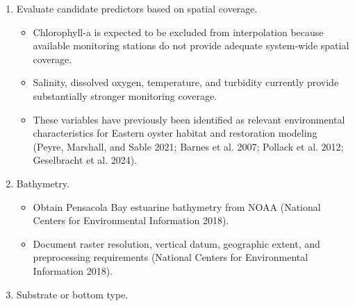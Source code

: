 \documentclass[
  letterpaper,
  DIV=11,
  numbers=noendperiod]{scrartcl}
\providecommand{\tightlist}{%
  \setlength{\itemsep}{0pt}\setlength{\parskip}{0pt}}
\begin{document}
\begin{enumerate}
\begin{enumerate}
    \begin{itemize}
    \tightlist
    \item
      Dissolved oxygen: approximately 145 stations and 3,072
      observations (USGS 2026).
    \item
      Salinity: approximately 135 stations and 3,401 observations (USGS
      2026).
    \item
      Temperature: approximately 145 stations and 3,442 observations
      (USGS 2026).
    \item
      Turbidity: approximately 122 stations and 1,563 observations (USGS
      2026).
    \item
      Chlorophyll-a: approximately 48 stations and 754 observations
      (USGS 2026).
    \item
      Current temporal coverage is approximately 2005--2024 (USGS 2026).
    \end{itemize}
  \item
    Evaluate candidate predictors based on spatial coverage.

    \begin{itemize}
    \tightlist
    \item
      Chlorophyll-a is expected to be excluded from interpolation
      because available monitoring stations do not provide adequate
      system-wide spatial coverage.
    \item
      Salinity, dissolved oxygen, temperature, and turbidity currently
      provide substantially stronger monitoring coverage.
    \item
      These variables have previously been identified as relevant
      environmental characteristics for Eastern oyster habitat and
      restoration modeling (Peyre, Marshall, and Sable 2021; Barnes et
      al. 2007; Pollack et al. 2012; Geselbracht et al. 2024).
    \end{itemize}
  \item
    Bathymetry.

    \begin{itemize}
    \tightlist
    \item
      Obtain Pensacola Bay estuarine bathymetry from NOAA (National
      Centers for Environmental Information 2018).
    \item
      Document raster resolution, vertical datum, geographic extent, and
      preprocessing requirements (National Centers for Environmental
      Information 2018).
    \end{itemize}
  \item
    Substrate or bottom type.


\end{enumerate}
\end{enumerate}
\end{document}
